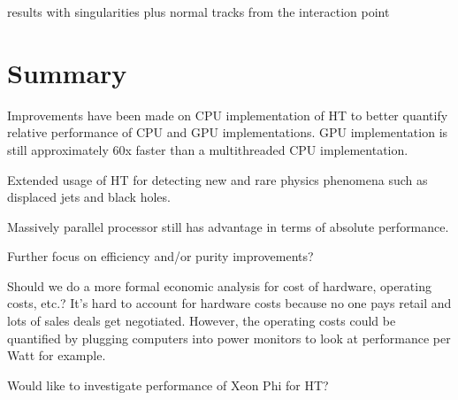 \documentclass{JINST}
\begin{document}
results with singularities plus normal tracks from the interaction point


\section{Summary}

Improvements have been made on CPU implementation of HT to better quantify relative performance of CPU and GPU implementations.  GPU implementation is still approximately 60x faster than a multithreaded CPU implementation.

Extended usage of HT for detecting new and rare physics phenomena such as displaced jets and black holes.

Massively parallel processor still has advantage in terms of absolute performance.

Further focus on efficiency and/or purity improvements?

Should we do a more formal economic analysis for cost of hardware, operating costs, etc.?  It's hard to account for hardware costs because no one pays retail and lots of sales deals get negotiated.  However, the operating costs could be quantified by plugging computers into power monitors to look at performance per Watt for example.

Would like to investigate performance of Xeon Phi for HT?
\end{document}
